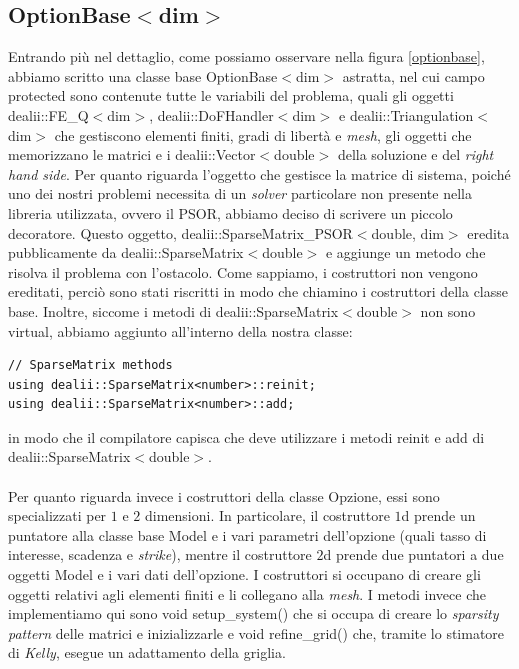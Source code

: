 \documentclass[a4paper,10pt]{report}
\theoremstyle{plain}
\theoremstyle{definition}
\theoremstyle{remark}
\begin{document}
\subsection{\textsf{OptionBase$<$dim$>$}}
Entrando pi\`u nel dettaglio, come possiamo osservare nella figura \ref{optionbase}, abbiamo scritto una classe base \textsf{OptionBase$<$dim$>$} astratta, nel cui campo \textsf{protected} sono contenute tutte le variabili del problema, quali gli oggetti \textsf{dealii::FE\_Q$<$dim$>$}, \textsf{dealii::DoFHandler$<$dim$>$} e \textsf{dealii::Triangulation$<$dim$>$} che gestiscono elementi finiti, gradi di libert\`a e \emph{mesh}, gli oggetti che memorizzano le matrici e i \textsf{dealii::Vector$<$double$>$} della soluzione e del \emph{right hand side}. Per quanto riguarda l'oggetto che gestisce la matrice di sistema, poich\'e uno dei nostri problemi necessita di un \emph{solver} particolare non presente nella libreria utilizzata, ovvero il PSOR, abbiamo deciso di scrivere un piccolo decoratore. Questo oggetto, \textsf{dealii::SparseMatrix\_PSOR$<$double, dim$>$} eredita pubblicamente da \textsf{dealii::SparseMatrix$<$double$>$} e aggiunge un metodo che risolva il problema con l'ostacolo. Come sappiamo, i costruttori non vengono ereditati, perci\`o sono stati riscritti in modo che chiamino i costruttori della classe base. Inoltre, siccome i metodi di \textsf{dealii::SparseMatrix$<$double$>$} non sono \textsf{virtual}, abbiamo aggiunto all'interno della nostra classe:
\begin{lstlisting}
// SparseMatrix methods
using dealii::SparseMatrix<number>::reinit;
using dealii::SparseMatrix<number>::add;
\end{lstlisting}
in modo che il compilatore capisca che deve utilizzare i metodi \textsf{reinit} e \textsf{add} di \textsf{dealii::SparseMatrix$<$double$>$}.\\\\Per quanto riguarda invece i costruttori della classe Opzione, essi sono specializzati per $1$ e $2$ dimensioni. In particolare, il costruttore $1$d prende un puntatore alla classe base \textsf{Model} e i vari parametri dell'opzione (quali tasso di interesse, scadenza e \emph{strike}), mentre il costruttore $2$d prende due puntatori a due oggetti \textsf{Model} e i vari dati dell'opzione. I costruttori si occupano di creare gli oggetti relativi agli elementi finiti e li collegano alla \emph{mesh}. I metodi invece che implementiamo qui sono \textsf{void setup\_system()} che si occupa di creare lo \emph{sparsity pattern} delle matrici e inizializzarle e \textsf{void refine\_grid()} che, tramite lo stimatore di \emph{Kelly}, esegue un adattamento della griglia.
\end{document}
